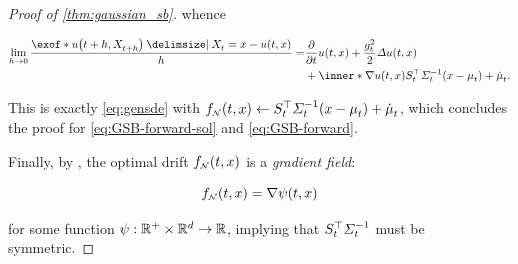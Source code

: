 \begin{proof}[Proof of \cref{thm:gaussian_sb}]
whence 

\begin{align}
\nn
\lim_{ h\to 0}  \frac{  \exof*{ \testf[\ctime+h][\Xsol[\ctime+h]] \given \Xsol = x }  - \testf  }{h} = &\frac{\del}{\del \ctime} \testf +  \frac{\volatsq[\ctime]}{2} \Laplace \testf \\
 &+  \inner*{  \nabla \testf }{ \St^\top \Sigmasolinv\parens*{ \point - \meansol  } + \dmeansol  }.
\end{align}

This is exactly \eqref{eq:gensde} with $\GSBf \subs \St^\top \Sigmasolinv\parens*{ \point - \meansol  } + \dmeansol$, which concludes the proof for \eqref{eq:GSB-forward-sol} and \eqref{eq:GSB-forward}.

Finally, by \citet[(4.2)]{leonard2013survey}, the optimal drift $\GSBf$ is a \emph{gradient field}: 

\begin{equation}
\GSBf = \nabla \psi(\ctime,\point)
\end{equation}

for some function $\psi: \mathbb{R}^+ \times \mathbb{R}^d \to \mathbb{R}$, implying that $S_{t}^\top\Sigma^{-1}_{ t }$ must be symmetric.
\end{proof}
